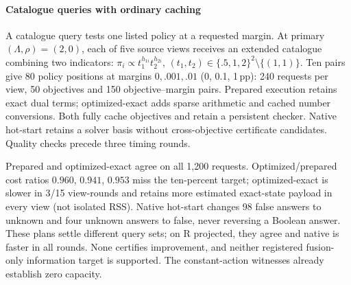 \paragraph{Catalogue queries with ordinary caching}
A catalogue query tests one listed policy at a requested margin. At primary $(\Lambda,\rho)=(2,0)$, each of five source views receives an extended
catalogue combining two indicators:
$\pi_i\propto t_1^{h_{1i}}t_2^{h_{2i}}$,
$(t_1,t_2)\in\{.5,1,2\}^2\setminus\{(1,1)\}$.
Ten pairs give 80 policy positions at margins $0,.001,.01$ (0, 0.1, 1\,pp):
240 requests per view, 50 objectives and 150 objective--margin pairs.
Prepared execution retains exact dual terms; optimized-exact adds sparse
arithmetic and cached number conversions. Both fully cache objectives and retain a persistent checker.
Native hot-start retains a solver basis without cross-objective certificate candidates.
Quality checks precede three timing rounds.

Prepared and optimized-exact agree on all 1,200 requests.
Optimized/prepared cost ratios $0.960$, $0.941$, $0.953$ miss the ten-percent
target; optimized-exact is slower in 3/15 view-rounds and retains more
estimated exact-state payload in every view (not isolated RSS).
Native hot-start changes 98 false answers to unknown and four unknown answers
to false, never reversing a Boolean answer. These plans settle different query sets; on R projected, they agree and native is faster in all rounds. None certifies improvement, and neither registered fusion-only information target is supported.
The constant-action witnesses already establish zero capacity.

